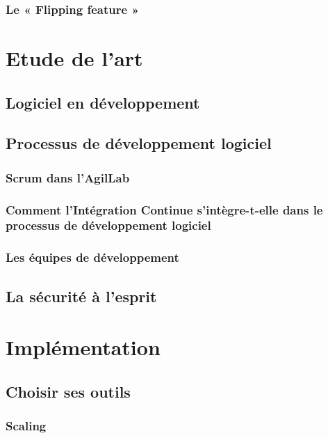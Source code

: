 \documentclass{report}
\begin{document}
        \subsection{Le « Flipping feature »}

    \chapter{Etude de l'art}

      \section{Logiciel en développement}

      \section{Processus de développement logiciel}

        \subsection{Scrum dans l'AgilLab}

        \subsection{Comment l’Intégration Continue s’intègre-t-elle dans le processus de développement logiciel}

        \subsection{Les équipes de développement}

      \section{La sécurité à l'esprit}

    \chapter{Implémentation}

      \section{Choisir ses outils}

        \subsection{Scaling}
\end{document}
